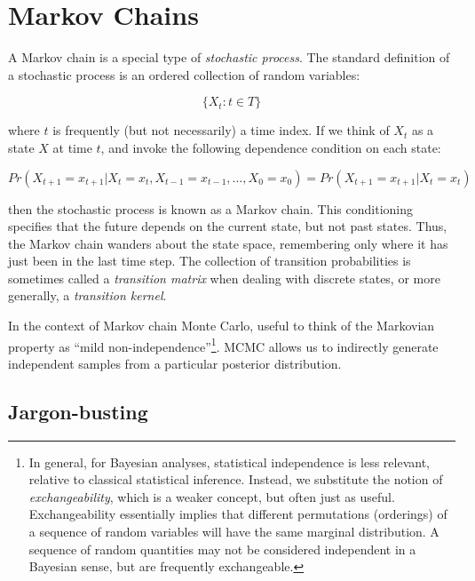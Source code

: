 
\hypertarget{markov-chains}{}
\section*{Markov Chains}

A Markov chain is a special type of \emph{stochastic process}. The standard definition of a stochastic process is an ordered collection of random variables:

\[
\{X_t:t \in T\}
\]

\noindent where $t$ is frequently (but not necessarily) a time index. If we think of $X_t$ as a state $X$ at time $t$, and invoke the following dependence condition on each state:

\[
Pr(X_{t+1}=x_{t+1} | X_t=x_t, X_{t-1}=x_{t-1},\ldots,X_0=x_0) = Pr(X_{t+1}=x_{t+1} | X_t=x_t)
\]

\noindent then the stochastic process is known as a Markov chain. This conditioning specifies that the future depends on the current state, but not past states. Thus, the Markov chain wanders about the state space, remembering only where it has just been in the last time step. The collection of transition probabilities is sometimes called a \emph{transition matrix} when dealing with discrete states, or more generally, a \emph{transition kernel}. 

\noindent In the context of Markov chain Monte Carlo, useful to think of the Markovian property as ``mild non-independence''\footnote{In general, for Bayesian analyses, statistical independence is less relevant, relative to classical statistical inference. Instead, we substitute the notion of \emph{exchangeability}, which is a weaker concept, but often just as useful. Exchangeability essentially implies that different permutations (orderings) of a sequence of random variables will have the same marginal distribution. A sequence of random quantities may not be considered independent in a Bayesian sense, but are frequently exchangeable.}. MCMC allows us to indirectly generate independent samples from a particular posterior distribution.


\hypertarget{jargon-busting}{}
\subsection*{Jargon-busting}

